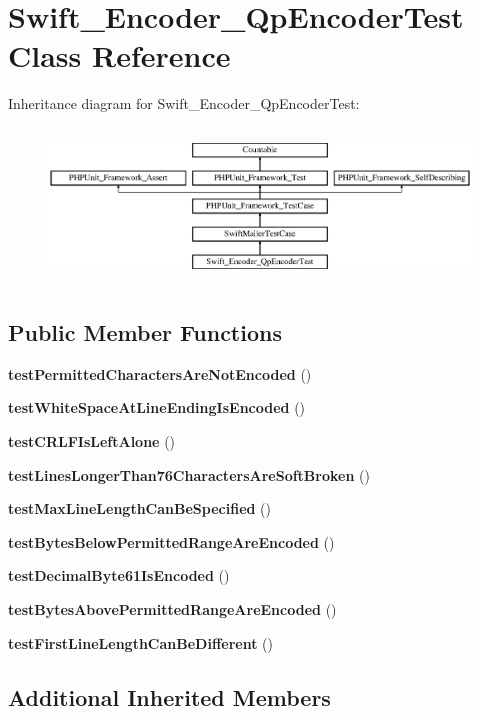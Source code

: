\section{Swift\+\_\+\+Encoder\+\_\+\+Qp\+Encoder\+Test Class Reference}
\label{class_swift___encoder___qp_encoder_test}
Inheritance diagram for Swift\+\_\+\+Encoder\+\_\+\+Qp\+Encoder\+Test\+:\begin{figure}[H]
\begin{center}
\leavevmode
\includegraphics[height=4.129793cm]{class_swift___encoder___qp_encoder_test}
\end{center}
\end{figure}
\subsection*{Public Member Functions}
\begin{DoxyCompactItemize}
\item 
{\bf test\+Permitted\+Characters\+Are\+Not\+Encoded} ()
\item 
{\bf test\+White\+Space\+At\+Line\+Ending\+Is\+Encoded} ()
\item 
{\bf test\+C\+R\+L\+F\+Is\+Left\+Alone} ()
\item 
{\bf test\+Lines\+Longer\+Than76\+Characters\+Are\+Soft\+Broken} ()
\item 
{\bf test\+Max\+Line\+Length\+Can\+Be\+Specified} ()
\item 
{\bf test\+Bytes\+Below\+Permitted\+Range\+Are\+Encoded} ()
\item 
{\bf test\+Decimal\+Byte61\+Is\+Encoded} ()
\item 
{\bf test\+Bytes\+Above\+Permitted\+Range\+Are\+Encoded} ()
\item 
{\bf test\+First\+Line\+Length\+Can\+Be\+Different} ()
\end{DoxyCompactItemize}
\subsection*{Additional Inherited Members}



